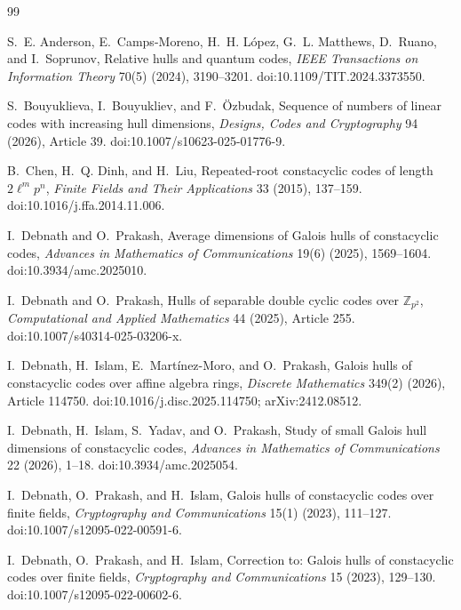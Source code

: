 \documentclass[11pt]{article}
\theoremstyle{definition}
\theoremstyle{remark}
\begin{document}
\begin{thebibliography}{99}

S.~E. Anderson, E.~Camps-Moreno, H.~H. L\'opez, G.~L. Matthews,
D.~Ruano, and I.~Soprunov,
Relative hulls and quantum codes,
\emph{IEEE Transactions on Information Theory} 70(5) (2024),
3190--3201. doi:10.1109/TIT.2024.3373550.

S.~Bouyuklieva, I.~Bouyukliev, and F.~\"Ozbudak,
Sequence of numbers of linear codes with increasing hull dimensions,
\emph{Designs, Codes and Cryptography} 94 (2026), Article 39.
doi:10.1007/s10623-025-01776-9.

B.~Chen, H.~Q. Dinh, and H.~Liu,
Repeated-root constacyclic codes of length \(2\ell^m p^n\),
\emph{Finite Fields and Their Applications} 33 (2015), 137--159.
doi:10.1016/j.ffa.2014.11.006.

I.~Debnath and O.~Prakash,
Average dimensions of Galois hulls of constacyclic codes,
\emph{Advances in Mathematics of Communications} 19(6) (2025),
1569--1604. doi:10.3934/amc.2025010.

I.~Debnath and O.~Prakash,
Hulls of separable double cyclic codes over \(\mathbb{Z}_{p^2}\),
\emph{Computational and Applied Mathematics} 44 (2025), Article 255.
doi:10.1007/s40314-025-03206-x.

I.~Debnath, H.~Islam, E.~Mart\'inez-Moro, and O.~Prakash,
Galois hulls of constacyclic codes over affine algebra rings,
\emph{Discrete Mathematics} 349(2) (2026), Article 114750.
doi:10.1016/j.disc.2025.114750; arXiv:2412.08512.

I.~Debnath, H.~Islam, S.~Yadav, and O.~Prakash,
Study of small Galois hull dimensions of constacyclic codes,
\emph{Advances in Mathematics of Communications} 22 (2026), 1--18.
doi:10.3934/amc.2025054.

I.~Debnath, O.~Prakash, and H.~Islam,
Galois hulls of constacyclic codes over finite fields,
\emph{Cryptography and Communications} 15(1) (2023), 111--127.
doi:10.1007/s12095-022-00591-6.

I.~Debnath, O.~Prakash, and H.~Islam,
Correction to: Galois hulls of constacyclic codes over finite fields,
\emph{Cryptography and Communications} 15 (2023), 129--130.
doi:10.1007/s12095-022-00602-6.


\end{thebibliography}
\end{document}

